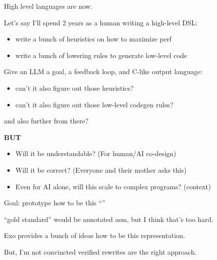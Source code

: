 {\LARGE

High level languages are  now.

\vfill

Let's say I'll spend 2 years as a human writing a high-level DSL:
\begin{itemize}
  \item write a bunch of heuristics on how to maximize perf
  \item write a bunch of lowering rules to generate low-level code
\end{itemize}

\vfill

Give an LLM a goal, a feedback loop, and C-like output language:
\begin{itemize}
  \item can't it also figure out those heuristics?
  \item can't it also figure out those low-level codegen rules?
\end{itemize}
and also further  from there?

\vfill

}

\newpage
{}

{\LARGE
\textbf{BUT}
\begin{itemize}
  \item Will it be understandable? (For human/AI co-design)
  \item Will it be correct? (Everyone and their mother asks this)
  \item Even for AI alone, will this scale to complex programs? (context)
\end{itemize}

\vfill

Goal: prototype how to be this ``''

``gold standard'' would be annotated asm, but I think that's too hard.

\vfill

Exo provides a bunch of ideas how to be this representation.

But, I'm not convincted verified rewrites are the right approach.

\vfill

}

\newpage
{}

